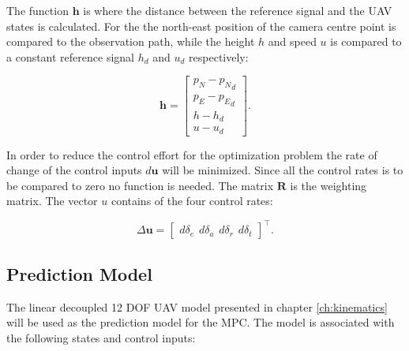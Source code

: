 The function $\mathbf{h}$ is where the distance between the reference signal and the UAV states is calculated. For the the north-east position of the camera centre point is compared to the observation path, while the height $h$ and speed $u$ is compared to a constant reference signal $h_d$ and $u_d$ respectively:

\begin{equation}
	\mathbf{h} =
	\begin{bmatrix}
		p_N - {p_N}_d \\
		p_E - {p_E}_d \\
		h - h_d \\
		u - u_d
	\end{bmatrix}.
\end{equation}

In order to reduce the control effort for the optimization problem the rate of change of the control inputs $d\mathbf{u}$ will be minimized. Since all the control rates is to be compared to zero no function is needed. The matrix $\mathbf{R}$ is the weighting matrix. The vector $u$ contains of the four control rates:

\begin{equation}
	\label{eq:control_rates}
	\Delta\mathbf{u} = 
	\begin{bmatrix}
		d\delta_e \hspace{5pt} d\delta_a \hspace{5pt} d\delta_r \hspace{5pt} d\delta_t
	\end{bmatrix} ^\intercal .
\end{equation}


\subsection{Prediction Model}

The linear decoupled 12 DOF UAV model presented in chapter \ref{ch:kinematics} will be used as the prediction model for the MPC. The model is associated with the following states and control inputs:

